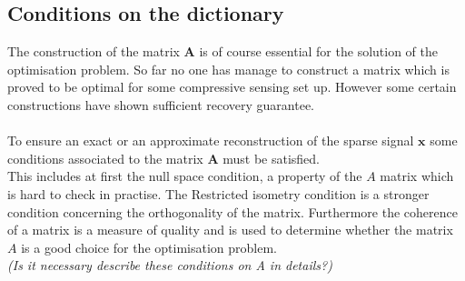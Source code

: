 \subsection{Conditions on the dictionary}
The construction of the matrix $\mathbf{A}$ is of course essential for the solution of the optimisation problem. So far no one has manage to construct a matrix which is proved to be optimal for some compressive sensing set up. However some certain constructions have shown sufficient recovery guarantee.\\ \\
To ensure an exact or an approximate reconstruction of the sparse signal $\mathbf{x}$ some conditions associated to the matrix $\mathbf{A}$ must be satisfied.\\
This includes at first the null space condition, a property of the $A$ matrix which is hard to check in practise. The Restricted isometry condition is a stronger condition concerning the orthogonality of the matrix. Furthermore the coherence of a matrix is a measure of quality and is used to determine whether the matrix $A$ is a good choice for the optimisation problem.\\    
\textit{(Is it necessary describe these conditions on A in details?)}

